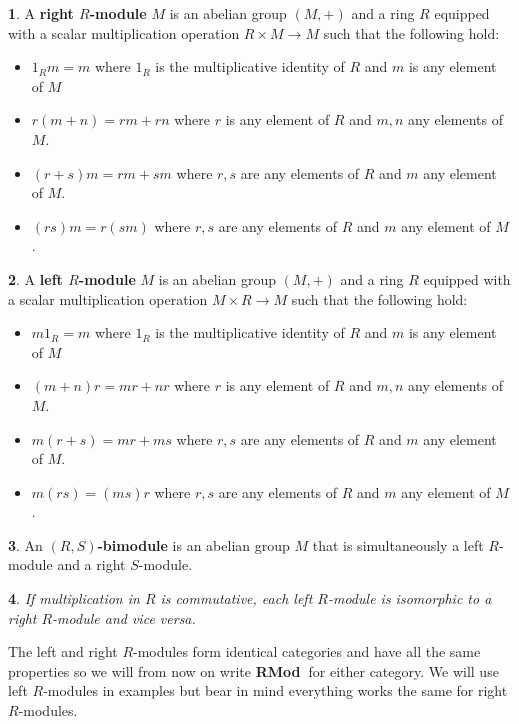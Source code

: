 \documentclass[oneside,english]{amsbook}
\numberwithin{section}{chapter}
\theoremstyle{plain}
\newtheorem{thm}{\protect\theoremname}
\theoremstyle{definition}
\newtheorem{defn}[thm]{\protect\definitionname}
\providecommand{\definitionname}{Definition}
\providecommand{\theoremname}{Theorem}
\newcommand{\catname}[1]{{\normalfont\textbf{#1}}}
\newcommand{\RMod}{\catname{RMod\ }}
\begin{document}
		\begin{defn}
			A \textbf{right $R$-module} $M$ is an abelian group $(M, +)$ and a ring $R$ equipped with a scalar multiplication operation $R\times M\to M$ such that the following hold:
			\begin{itemize}
				\item $1_Rm = m$ where $1_R$ is the multiplicative identity of $R$ and $m$ is any element of $M$
				\item $r(m + n) = rm + rn$ where $r$ is any element of $R$ and $m, n$ any elements of $M$.
				\item $(r + s)m = rm + sm$ where $r, s$ are any elements of $R$ and $m$ any element of $M$.
				\item $(rs)m = r(sm)$ where $r, s$ are any elements of $R$ and $m$ any element of $M$.
			\end{itemize}
		\end{defn}
	
		\begin{defn}
			A \textbf{left $R$-module} $M$ is an abelian group $(M, +)$ and a ring $R$ equipped with a scalar multiplication operation $M\times R\to M$ such that the following hold:
			\begin{itemize}
				\item $m1_R = m$ where $1_R$ is the multiplicative identity of $R$ and $m$ is any element of $M$
				\item $(m + n)r = mr + nr$ where $r$ is any element of $R$ and $m, n$ any elements of $M$.
				\item $m(r + s) = mr + ms$ where $r, s$ are any elements of $R$ and $m$ any element of $M$.
				\item $m(rs) = (ms)r$ where $r, s$ are any elements of $R$ and $m$ any element of $M$.
			\end{itemize}
		\end{defn}
		
		\begin{defn}
			An \textbf{$(R, S)$-bimodule} is an abelian group $M$ that is simultaneously a left $R$-module and a right $S$-module.
		\end{defn}
		
		\begin{thm}
			If multiplication in $R$ is commutative, each left $R$-module is isomorphic to a right $R$-module and \textit{vice versa}.
		\end{thm}
		
		The left and right $R$-modules form identical categories and have all the same properties so we will from now on write \RMod for either category. We will use left $R$-modules in examples but bear in mind everything works the same for right $R$-modules.
\end{document}
